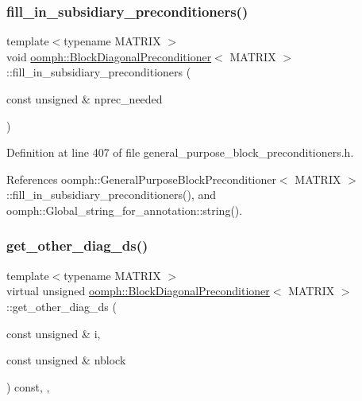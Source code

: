 \subsubsection{\texorpdfstring{fill\+\_\+in\+\_\+subsidiary\+\_\+preconditioners()}{fill\_in\_subsidiary\_preconditioners()}}
{\footnotesize\ttfamily template$<$typename M\+A\+T\+R\+IX $>$ \\
void \hyperlink{classoomph_1_1BlockDiagonalPreconditioner}{oomph\+::\+Block\+Diagonal\+Preconditioner}$<$ M\+A\+T\+R\+IX $>$\+::fill\+\_\+in\+\_\+subsidiary\+\_\+preconditioners (\begin{DoxyParamCaption}\item[{const unsigned \&}]{nprec\+\_\+needed }\end{DoxyParamCaption})\hspace{0.3cm}{\ttfamily [inline]}}



Definition at line 407 of file general\+\_\+purpose\+\_\+block\+\_\+preconditioners.\+h.



References oomph\+::\+General\+Purpose\+Block\+Preconditioner$<$ M\+A\+T\+R\+I\+X $>$\+::fill\+\_\+in\+\_\+subsidiary\+\_\+preconditioners(), and oomph\+::\+Global\+\_\+string\+\_\+for\+\_\+annotation\+::string().

\mbox{\label{classoomph_1_1BlockDiagonalPreconditioner_acb723bba0b200adc25c9df9003c09205}} 
\subsubsection{\texorpdfstring{get\+\_\+other\+\_\+diag\+\_\+ds()}{get\_other\_diag\_ds()}}
{\footnotesize\ttfamily template$<$typename M\+A\+T\+R\+IX $>$ \\
virtual unsigned \hyperlink{classoomph_1_1BlockDiagonalPreconditioner}{oomph\+::\+Block\+Diagonal\+Preconditioner}$<$ M\+A\+T\+R\+IX $>$\+::get\+\_\+other\+\_\+diag\+\_\+ds (\begin{DoxyParamCaption}\item[{const unsigned \&}]{i,  }\item[{const unsigned \&}]{nblock }\end{DoxyParamCaption}) const\hspace{0.3cm}{\ttfamily [inline]}, {\ttfamily [protected]}, {\ttfamily [virtual]}}

